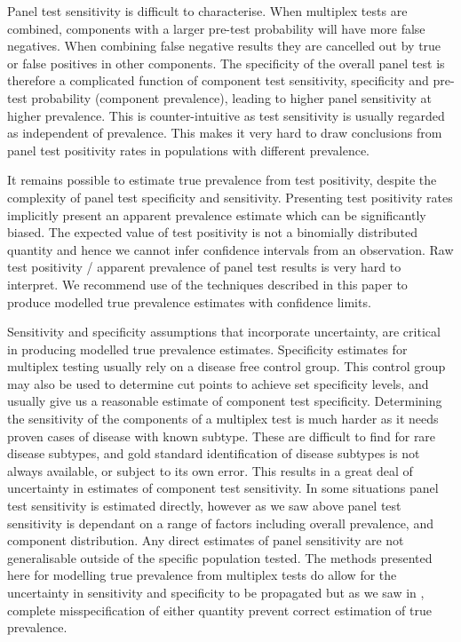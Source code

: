 \documentclass[10pt,letterpaper]{article}
\begin{document}
Panel test sensitivity is difficult to characterise. When multiplex tests are combined, components with a larger pre-test probability will have more false negatives. When combining false negative results they are cancelled out by true or false positives in other components. The specificity of the overall panel test is therefore a complicated function of component test sensitivity, specificity and pre-test probability (component prevalence), leading to higher panel sensitivity at higher prevalence. This is counter-intuitive as test sensitivity is usually regarded as independent of prevalence. This makes it very hard to draw conclusions from panel test positivity rates in populations with different prevalence.

It remains possible to estimate true prevalence from test positivity, despite the complexity of panel test specificity and sensitivity. Presenting test positivity rates implicitly present an apparent prevalence estimate which can be significantly biased. The expected value of test positivity is not a binomially distributed quantity and hence we cannot infer confidence intervals from an observation. Raw test positivity / apparent prevalence of panel test results is very hard to interpret. We recommend use of the techniques described in this paper to produce modelled true prevalence estimates with confidence limits.

Sensitivity and specificity assumptions that incorporate uncertainty, are critical in producing modelled true prevalence estimates. Specificity estimates for multiplex testing usually rely on a disease free control group. This control group may also be used to determine cut points to achieve set specificity levels, and usually give us a reasonable estimate of component test specificity. Determining the sensitivity of the components of a multiplex test is much harder as it needs proven cases of disease with known subtype. These are difficult to find for rare disease subtypes, and gold standard identification of disease subtypes is not always available, or subject to its own error\cite{loeffelholz2020,leber2018}. This results in a great deal of uncertainty in estimates of component test sensitivity. In some situations panel test sensitivity is estimated directly, however as we saw above panel test sensitivity is dependant on a range of factors including overall prevalence, and component distribution. Any direct estimates of panel sensitivity are not generalisable outside of the specific population tested. The methods presented here for modelling true prevalence from multiplex tests do allow for the uncertainty in sensitivity and specificity to be propagated but as we saw in , complete misspecification of either quantity prevent correct estimation of true prevalence.
\end{document}
